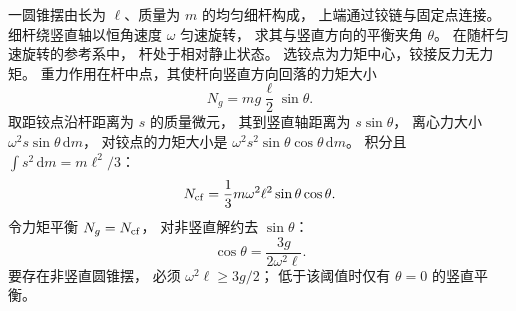 一圆锥摆由长为 $\ell$、质量为 $m$ 的均匀细杆构成，
上端通过铰链与固定点连接。
细杆绕竖直轴以恒角速度 $\omega$ 匀速旋转，
求其与竖直方向的平衡夹角 $\theta$。
\exsolution
在随杆匀速旋转的参考系中，
杆处于相对静止状态。
选铰点为力矩中心，铰接反力无力矩。
重力作用在杆中点，其使杆向竖直方向回落的力矩大小
\[
N_g=mg\frac{\ell}{2}\sin\theta.
\]
取距铰点沿杆距离为 $s$ 的质量微元，
其到竖直轴距离为 $s\sin\theta$，
离心力大小 $\omega^2s\sin\theta\,\mathrm dm$，
对铰点的力矩大小是
$\omega^2s^2\sin\theta\cos\theta\,\mathrm dm$。
积分且 $\int s^2\,\mathrm dm=m\ell^2/3$：
\[
N_{\rm cf}=\frac13m\omega^2\ell^2
\sin\theta\cos\theta.
\]
令力矩平衡 $N_g=N_{\rm cf}$，
对非竖直解约去 $\sin\theta$：
\[
\boxed{\cos\theta=\frac{3g}{2\omega^2\ell}}.
\]
\excheck 要存在非竖直圆锥摆，
必须 $\omega^2\ell\ge3g/2$；
低于该阈值时仅有 $\theta=0$ 的竖直平衡。

